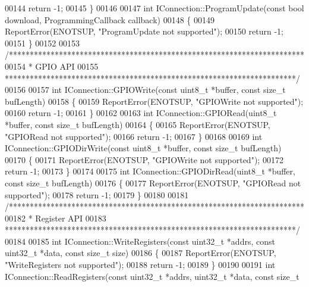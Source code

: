 \begin{DoxyCode}
00144     \textcolor{keywordflow}{return} -1;
00145 \}
00146 
00147 \textcolor{keywordtype}{int} IConnection::ProgramUpdate(\textcolor{keyword}{const} \textcolor{keywordtype}{bool} download, ProgrammingCallback callback)
00148 \{
00149     ReportError(ENOTSUP, \textcolor{stringliteral}{"ProgramUpdate not supported"});
00150     \textcolor{keywordflow}{return} -1;
00151 \}
00152 
00153 \textcolor{comment}{/***********************************************************************}
00154 \textcolor{comment}{ * GPIO API}
00155 \textcolor{comment}{ **********************************************************************/}
00156 
00157 \textcolor{keywordtype}{int} IConnection::GPIOWrite(\textcolor{keyword}{const} uint8\_t *buffer, \textcolor{keyword}{const} \textcolor{keywordtype}{size\_t} bufLength)
00158 \{
00159     ReportError(ENOTSUP, \textcolor{stringliteral}{"GPIOWrite not supported"});
00160     \textcolor{keywordflow}{return} -1;
00161 \}
00162 
00163 \textcolor{keywordtype}{int} IConnection::GPIORead(uint8\_t *buffer, \textcolor{keyword}{const} \textcolor{keywordtype}{size\_t} bufLength)
00164 \{
00165     ReportError(ENOTSUP, \textcolor{stringliteral}{"GPIORead not supported"});
00166     \textcolor{keywordflow}{return} -1;
00167 \}
00168 
00169 \textcolor{keywordtype}{int} IConnection::GPIODirWrite(\textcolor{keyword}{const} uint8\_t *buffer, \textcolor{keyword}{const} \textcolor{keywordtype}{size\_t} bufLength)
00170 \{
00171     ReportError(ENOTSUP, \textcolor{stringliteral}{"GPIOWrite not supported"});
00172     \textcolor{keywordflow}{return} -1;
00173 \}
00174 
00175 \textcolor{keywordtype}{int} IConnection::GPIODirRead(uint8\_t *buffer, \textcolor{keyword}{const} \textcolor{keywordtype}{size\_t} bufLength)
00176 \{
00177     ReportError(ENOTSUP, \textcolor{stringliteral}{"GPIORead not supported"});
00178     \textcolor{keywordflow}{return} -1;
00179 \}
00180 
00181 \textcolor{comment}{/***********************************************************************}
00182 \textcolor{comment}{ * Register API}
00183 \textcolor{comment}{ **********************************************************************/}
00184 
00185 \textcolor{keywordtype}{int} IConnection::WriteRegisters(\textcolor{keyword}{const} uint32\_t *addrs, \textcolor{keyword}{const} uint32\_t *data, \textcolor{keyword}{const} \textcolor{keywordtype}{size\_t} 
      size)
00186 \{
00187     ReportError(ENOTSUP, \textcolor{stringliteral}{"WriteRegisters not supported"});
00188     \textcolor{keywordflow}{return} -1;
00189 \}
00190 
00191 \textcolor{keywordtype}{int} IConnection::ReadRegisters(\textcolor{keyword}{const} uint32\_t *addrs, uint32\_t *data, \textcolor{keyword}{const} \textcolor{keywordtype}{size\_t} 

\end{DoxyCode}
